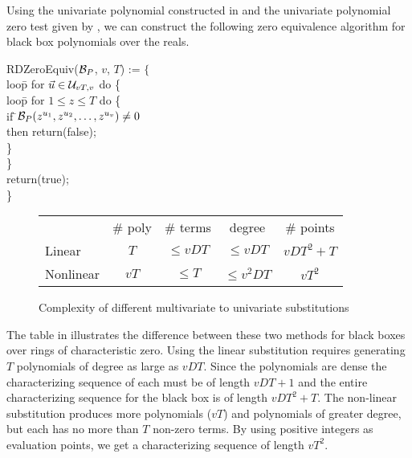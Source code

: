 Using the univariate polynomial constructed in
 and the univariate polynomial zero test 
given by , we can construct the
following zero equivalence algorithm for black box polynomials over
the reals.

\begindsacode
RDZeroEquiv(${\cal B}_P$, $v$, $T$) := $\{$\\
\>loo\=p for $\vec{u} \in {\cal U}_{vT,v}$ do \{ \\
\>\> loo\=p for $1 \le z \le T$ do \{ \\
\>\>\> if \=${\cal B}_P(z^{u_1}, z^{u_2}, \ldots, z^{u_v}) \not= 0$ \\
\>\>\>\>then return(false); \\
\>\>\> \}\\
\>\> \}\\
\> return(true); \\
\> \}
\enddsacode

\begin{figure}
\begin{center}
\begin{tabular}{l|c|c|c|c|}
\multicolumn{1}{c}{} 
& \multicolumn{1}{c}{\# poly} & \multicolumn{1}{c}{\# terms} &
 \multicolumn{1}{c}{degree} & \multicolumn{1}{c}{\# points} \\ \cline{2-5}
Linear & $T$ & $\le vDT$ & $\le vDT$ & $vDT^2+T$ \\ \cline{2-5}
Nonlinear & $vT$ & $\le T$ & $\le v^2DT$ & $vT^2$ \\ \cline{2-5}
\end{tabular}
\end{center}
\caption{Complexity of different multivariate to univariate substitutions\label{Mult:Uni:Fig}}
\end{figure}

The table in  illustrates the difference between
these two methods for black boxes over rings of characteristic zero.
Using the linear substitution  requires
generating $T$ polynomials of degree as large as $vDT$.  Since the
polynomials are dense the characterizing sequence of each must be of
length $vDT+1$ and the entire characterizing sequence for the black
box is of length $vDT^2+T$.  The non-linear substitution
 produces more polynomials ($vT$) and
polynomials of greater degree, but each has no more than $T$ non-zero
terms.  By using positive integers as evaluation points, we get a
characterizing sequence of length $vT^2$.

